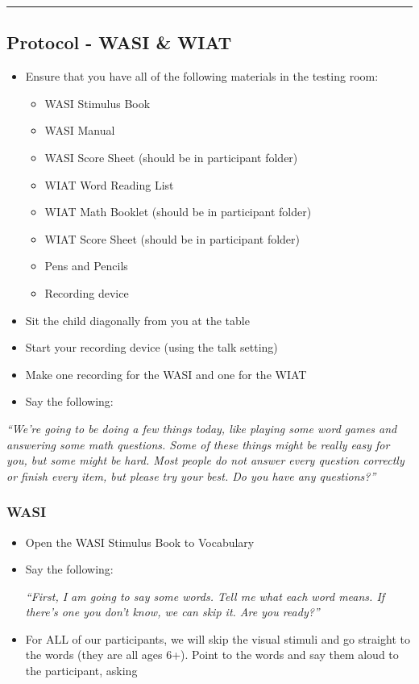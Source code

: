 \documentclass[]{book}
\providecommand{\tightlist}{%
  \setlength{\itemsep}{0pt}\setlength{\parskip}{0pt}}
\begin{document}
\begin{center}\rule{0.5\linewidth}{0.5pt}\end{center}

\hypertarget{protocol---wasi-wiat}{%
\subsection{Protocol - WASI \& WIAT}\label{protocol---wasi-wiat}}

\begin{itemize}
\tightlist
\item
  Ensure that you have all of the following materials in the testing room:

  \begin{itemize}
  \tightlist
  \item
    WASI Stimulus Book
  \item
    WASI Manual
  \item
    WASI Score Sheet (should be in participant folder)
  \item
    WIAT Word Reading List
  \item
    WIAT Math Booklet (should be in participant folder)
  \item
    WIAT Score Sheet (should be in participant folder)
  \item
    Pens and Pencils
  \item
    Recording device
  \end{itemize}
\item
  Sit the child diagonally from you at the table
\item
  Start your recording device (using the talk setting)
\item
  Make one recording for the WASI and one for the WIAT
\item
  Say the following:
\end{itemize}

\emph{``We're going to be doing a few things today, like playing some word games and answering some math questions. Some of these things might be really easy for you, but some might be hard. Most people do not answer every question correctly or finish every item, but please try your best. Do you have any questions?''}

\hypertarget{wasi}{%
\subsubsection{WASI}\label{wasi}}

\begin{itemize}
\item
  Open the WASI Stimulus Book to Vocabulary
\item
  Say the following:

  \emph{``First, I am going to say some words. Tell me what each word means.
  If there's one you don't know, we can skip it. Are you ready?''}
\item
  For ALL of our participants, we will skip the visual stimuli and go straight to the words (they are all ages 6+). Point to the words and say them aloud to the participant, asking
\end{itemize}
\end{document}
